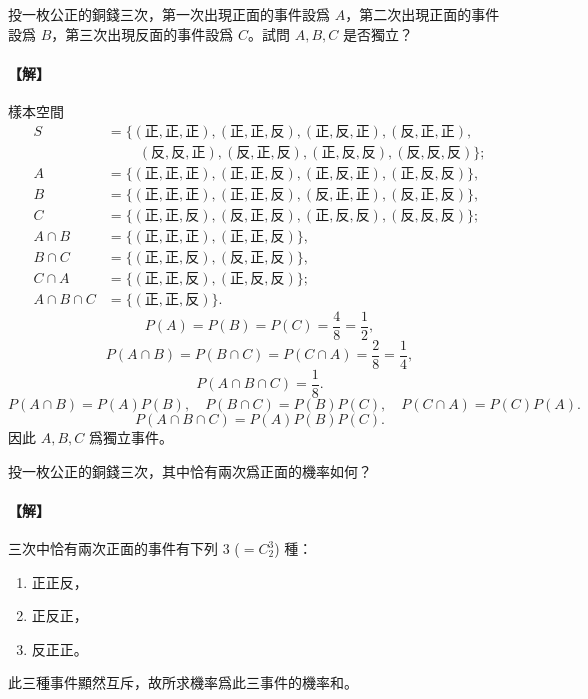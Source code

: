 \medskip
\begin{discussion}\label{disc:b5s-3-4}
投一枚公正的銅錢三次，第一次出現正面的事件設爲 $A$，第二次出現正面的事件設爲 $B$，第三次出現反面的事件設爲 $C$。試問 $A, B, C$ 是否獨立？
\end{discussion}
\paragraph{【解】}
樣本空間
\begin{align*}
S &= \{(\text{正}, \text{正}, \text{正}), (\text{正}, \text{正}, \text{反}), (\text{正}, \text{反}, \text{正}), (\text{反}, \text{正}, \text{正}), \\
  &\phantom{{}=\{ \ \ } (\text{反}, \text{反}, \text{正}), (\text{反}, \text{正}, \text{反}), (\text{正}, \text{反}, \text{反}), (\text{反}, \text{反}, \text{反})\}; \\
A &= \{(\text{正}, \text{正}, \text{正}), (\text{正}, \text{正}, \text{反}), (\text{正}, \text{反}, \text{正}), (\text{正}, \text{反}, \text{反})\}, \\
B &= \{(\text{正}, \text{正}, \text{正}), (\text{正}, \text{正}, \text{反}), (\text{反}, \text{正}, \text{正}), (\text{反}, \text{正}, \text{反})\}, \\
C &= \{(\text{正}, \text{正}, \text{反}), (\text{反}, \text{正}, \text{反}), (\text{正}, \text{反}, \text{反}), (\text{反}, \text{反}, \text{反})\}; \\
A \cap B &= \{(\text{正}, \text{正}, \text{正}), (\text{正}, \text{正}, \text{反})\}, \\
B \cap C &= \{(\text{正}, \text{正}, \text{反}), (\text{反}, \text{正}, \text{反})\}, \\
C \cap A &= \{(\text{正}, \text{正}, \text{反}), (\text{正}, \text{反}, \text{反})\}; \\
A \cap B \cap C &= \{(\text{正}, \text{正}, \text{反})\}.
\end{align*}
\[
P(A) = P(B) = P(C) = \frac{4}{8} = \frac{1}{2},
\]
\[
P(A \cap B) = P(B \cap C) = P(C \cap A) = \frac{2}{8} = \frac{1}{4},
\]
\[
P(A \cap B \cap C) = \frac{1}{8}.
\]
\[
P(A \cap B) = P(A)P(B),\quad P(B \cap C) = P(B)P(C),\quad P(C \cap A) = P(C)P(A).
\]
\[
P(A \cap B \cap C) = P(A)P(B)P(C).
\]
因此 $A, B, C$ 爲獨立事件。

\medskip
\begin{discussion}\label{disc:b5s-3-5}
投一枚公正的銅錢三次，其中恰有兩次爲正面的機率如何？
\end{discussion}
\paragraph{【解】}
三次中恰有兩次正面的事件有下列 $3$ ($=C_2^3$) 種：
\begin{enumerate}[1.]
  \item 正正反，
  \item 正反正，
  \item 反正正。
\end{enumerate}
此三種事件顯然互斥，故所求機率爲此三事件的機率和。

